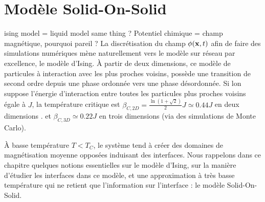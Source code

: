 \chapter{Modèle Solid-On-Solid}
    \label{chap-sos}
 {\color{red} ising model = liquid model same thing ?
 Potentiel chimique = champ magnétique, pourquoi pareil ?}
La discrétisation du champ $\phi({\bf x},t)$ afin de faire des simulations numériques mène naturellement vers le modèle sur réseau par excellence, le modèle d'Ising. À partir de deux dimensions, ce modèle de particules à interaction avec les plus proches voisins, possède une transition de second ordre depuis une phase ordonnée vers une phase désordonnée. Si lon suppose l'énergie d'interaction entre toutes les particules plus proches voisins égale à $J$, la température critique est $\beta_{C,2D} =  \frac{\ln(1+\sqrt{2})}{2} J \simeq 0.44 J$ en deux dimensions \cite{onsager_crystal_1944}. et $\beta_{C,3D} \simeq 0.22 J$ en trois dimensions \cite{talapov_magnetization_1996} (via des simulations de Monte Carlo).

À basse température $T \less T_C$, le système tend à créer des domaines de magnétisation moyenne opposées induisant des interfaces. Nous rappelons dans ce chapitre quelques notions essentielles sur le modèle d'Ising, sur la manière d'étudier les interfaces dans ce modèle, et une approximation à très basse température qui ne retient que l'information sur l'interface : le modèle Solid-On-Solid.

